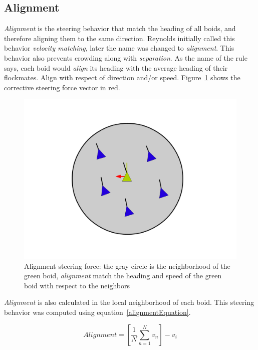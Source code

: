 \subsection{Alignment}
\textit{Alignment} is the steering behavior that match the heading of all boids, and therefore aligning them to the same direction. Reynolds initially called this behavior \textit{velocity matching}, later the name was changed to \textit{alignment}. This behavior also prevents crowding along with \textit{separation}. As the name of the rule says, each boid would \textit{align} its heading with the average heading of their flockmates. Align with respect of direction and/or speed. Figure~\ref{alignmentPDF}  shows the corrective steering force vector in red.

\begin{figure}[htbp]
\begin{center}
\includegraphics[scale=0.3]{figures/alignment.pdf}
\caption{Alignment steering force: the gray circle is the neighborhood of the green boid, \textit{alignment} match the heading and speed of the green boid with respect to the neighbors}
\label{alignmentPDF}
\end{center}
\end{figure}

\textit{Alignment} is also calculated in the local neighborhood of each boid. This steering behavior was computed using equation~\ref{alignmentEquation}.

\begin{equation}
\label{alignmentEquation}
Alignment = \left[  \frac{1}{N} \sum_{n=1}^{N} v_n \right ] - v_i
\end{equation}

